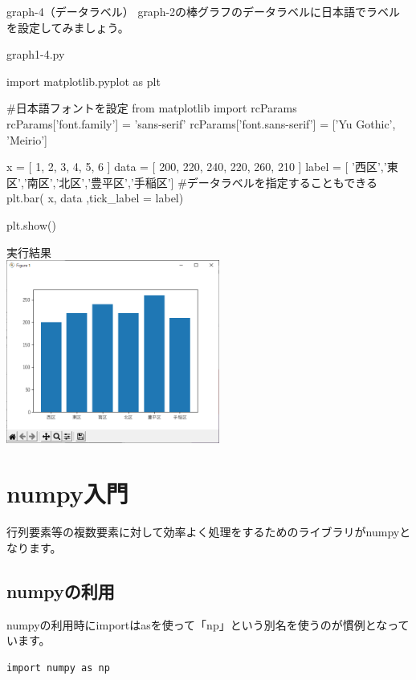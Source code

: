 \begin{pabox}{graph-4（データラベル）}
graph-2の棒グラフのデータラベルに日本語でラベルを設定してみましょう。
\begin{legbox}{graph1-4.py}
\begin{listing}{1}
import matplotlib.pyplot as plt

#日本語フォントを設定
from matplotlib import rcParams
rcParams['font.family'] = 'sans-serif'
rcParams['font.sans-serif'] = ['Yu Gothic', 'Meirio']

x = [ 1, 2, 3, 4, 5, 6 ]
data = [ 200, 220, 240, 220, 260, 210 ]
label = [ '西区','東区','南区','北区','豊平区','手稲区']
#データラベルを指定することもできる
plt.bar( x, data ,tick_label = label)

plt.show()
\end{listing}


実行結果\\

\includegraphics[width=7cm]{images/graph4.png} 

\end{legbox}
\end{pabox}


\section{numpy入門}
行列要素等の複数要素に対して効率よく処理をするためのライブラリがnumpyとなります。
\subsection{numpyの利用}

numpyの利用時にimportはasを使って「np」という別名を使うのが慣例となっています。

\begin{verbatim}
import numpy as np

\end{verbatim}


